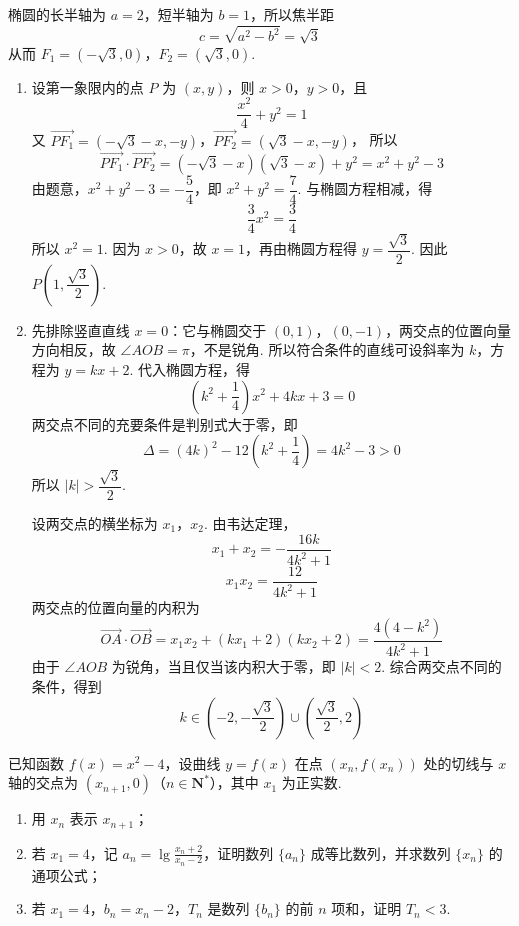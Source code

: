 \begin{solution}
椭圆的长半轴为 \(a=2\)，短半轴为 \(b=1\)，所以焦半距
\[
c=\sqrt{a^{2}-b^{2}}=\sqrt3
\]
从而 \(F_{1}=(-\sqrt3,0)\)，\(F_{2}=(\sqrt3,0)\).

\begin{enumerate}
\item 设第一象限内的点 \(P\) 为 \((x,y)\)，则 \(x>0\)，\(y>0\)，且
\[
\frac{x^{2}}4+y^{2}=1
\]
又
\(\overrightarrow{PF_{1}}=(-\sqrt3-x,-y)\)，\(\overrightarrow{PF_{2}}=(\sqrt3-x,-y)\)，
所以
\[
\overrightarrow{PF_{1}}\cdot\overrightarrow{PF_{2}}
=(-\sqrt3-x)(\sqrt3-x)+y^{2}=x^{2}+y^{2}-3
\]
由题意，\(x^{2}+y^{2}-3=-\dfrac54\)，即 \(x^{2}+y^{2}=\dfrac74\). 与椭圆方程相减，得
\[
\frac34x^{2}=\frac34
\]
所以 \(x^{2}=1\). 因为 \(x>0\)，故 \(x=1\)，再由椭圆方程得 \(y=\dfrac{\sqrt3}{2}\). 因此 \(P\left(1,\dfrac{\sqrt3}{2}\right)\).
\item 先排除竖直直线 \(x=0\)：它与椭圆交于 \((0,1)\)，\((0,-1)\)，两交点的位置向量方向相反，故 \(\angle AOB=\pi\)，不是锐角. 所以符合条件的直线可设斜率为 \(k\)，方程为 \(y=kx+2\). 代入椭圆方程，得
\[
\left(k^{2}+\frac14\right)x^{2}+4kx+3=0
\]
两交点不同的充要条件是判别式大于零，即
\[
\Delta=(4k)^{2}-12\left(k^{2}+\frac14\right)=4k^{2}-3>0
\]
所以 \(\lvert k\rvert>\dfrac{\sqrt3}{2}\).

设两交点的横坐标为 \(x_{1}\)，\(x_{2}\). 由韦达定理，
\[
x_{1}+x_{2}=-\frac{16k}{4k^{2}+1}
\]
\[
x_{1}x_{2}=\frac{12}{4k^{2}+1}
\]
两交点的位置向量的内积为
\[
\overrightarrow{OA}\cdot\overrightarrow{OB}
=x_{1}x_{2}+(kx_{1}+2)(kx_{2}+2)
=\frac{4(4-k^{2})}{4k^{2}+1}
\]
由于 \(\angle AOB\) 为锐角，当且仅当该内积大于零，即 \(\lvert k\rvert<2\). 综合两交点不同的条件，得到
\[
k\in\left(-2,-\frac{\sqrt3}{2}\right)\cup\left(\frac{\sqrt3}{2},2\right)
\]
\end{enumerate}
\end{solution}

\begin{problem}
已知函数 \( f(x) = x^2 - 4 \)，设曲线 \( y = f(x) \) 在点 \( (x_n, f(x_n)) \) 处的切线与 \( x \) 轴的交点为 \( (x_{n+1}, 0) \)（\(n \in \mathbf{N}^*\)），其中 \( x_1 \) 为正实数.
\begin{enumerate}
\item 用 \(x_{n}\) 表示 \(x_{n + 1}\)；
\item 若 \(x_{1} = 4\)，记 \(a_{n} = \lg \frac{x_{n} + 2}{x_{n} - 2}\)，证明数列 \(\{a_{n}\}\) 成等比数列，并求数列 \(\{x_{n}\}\) 的通项公式；
\item 若 \(x_{1} = 4\)，\(b_{n} = x_{n} - 2\)，\(T_{n}\) 是数列 \(\{b_{n}\}\) 的前 \(n\) 项和，证明 \(T_{n} < 3\).
\end{enumerate}

\end{problem}

